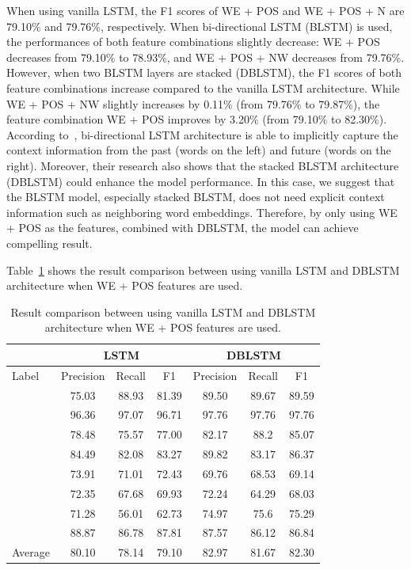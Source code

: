 When using vanilla LSTM, the F1 scores of WE + POS and WE + POS + N are 79.10\% and 79.76\%, respectively. When bi-directional LSTM (BLSTM) is used, the performances of both feature combinations slightly decrease: WE + POS decreases from 79.10\% to 78.93\%, and WE + POS + NW decreases from 79.76\%. However, when two BLSTM layers are stacked (DBLSTM), the F1 scores of both feature combinations increase compared to the vanilla LSTM architecture. While WE + POS + NW slightly increases by 0.11\% (from 79.76\% to 79.87\%), the feature combination WE + POS improves by 3.20\% (from 79.10\% to 82.30\%). According to~\cite{zhou2015end}, bi-directional LSTM architecture is able to implicitly capture the context information from the past (words on the left) and future (words on the right). Moreover, their research also shows that the stacked BLSTM architecture (DBLSTM) could enhance the model performance. In this case, we suggest that the BLSTM model, especially stacked BLSTM, does not need explicit context information such as neighboring word embeddings. Therefore, by only using WE + POS as the features, combined with DBLSTM, the model can achieve compelling result.

Table~\ref{tab:lstmdblstm} shows the result comparison between using vanilla LSTM and DBLSTM architecture when WE + POS features are used.

\begin{table}
	\centering
	\caption{Result comparison between using vanilla LSTM and DBLSTM architecture when WE + POS features are used.}
	\label{tab:lstmdblstm}
	\begin{tabular}{|l|ccc|ccc|}
		\hline
		& \multicolumn{3}{c}{ LSTM } & \multicolumn{3}{c}{ DBLSTM } \\
		\hline
		Label & Precision & Recall & F1 & Precision & Recall & F1 \\
		\hline\hline
		\agent & 75.03 & 88.93 & 81.39 & 89.50 & 89.67 & 89.59 \\
		\predicate & 96.36 & 97.07 & 96.71 & 97.76 & 97.76 & 97.76 \\
		\patient  & 78.48 & 75.57 & 77.00 & 82.17 & 88.2 & 85.07 \\
		\modal & 84.49 & 82.08 & 83.27 & 89.82 & 83.17 & 86.37 \\
		\beneficiary & 73.91 & 71.01 & 72.43 & 69.76 & 68.53 & 69.14 \\
		\location  & 72.35 & 67.68 & 69.93 & 72.24 & 64.29 & 68.03 \\
		\greet  & 71.28 & 56.01 & 62.73 & 74.97 & 75.6 & 75.29 \\
		\timesrl  & 88.87 & 86.78 & 87.81 & 87.57 & 86.12 & 86.84 \\
		\hline
		Average & 80.10 & 78.14 & 79.10 & 82.97 & 81.67 & 82.30 \\
		\hline
	\end{tabular}
	
\end{table}

